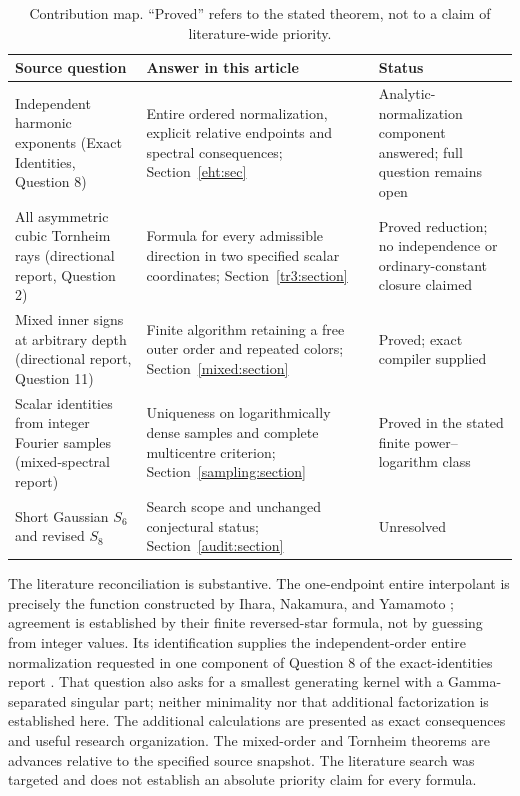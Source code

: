 \begin{table}[htbp]
\centering\small
\begin{tabular}{@{}L{0.28\textwidth}L{0.43\textwidth}L{0.22\textwidth}@{}}
\toprule
Source question & Answer in this article & Status \\
\midrule
Independent harmonic exponents (Exact Identities, Question 8)
& Entire ordered normalization, explicit relative endpoints and
  spectral consequences; Section~\ref{eht:sec}
& Analytic-normalization component answered; full question remains open \\
\addlinespace
All asymmetric cubic Tornheim rays (directional report, Question 2)
& Formula for every admissible direction in two specified scalar
  coordinates; Section~\ref{tr3:section}
& Proved reduction; no independence or ordinary-constant closure claimed \\
\addlinespace
Mixed inner signs at arbitrary depth (directional report, Question 11)
& Finite algorithm retaining a free outer order and repeated colors;
  Section~\ref{mixed:section}
& Proved; exact compiler supplied \\
\addlinespace
Scalar identities from integer Fourier samples (mixed-spectral report)
& Uniqueness on logarithmically dense samples and complete multicentre
  criterion; Section~\ref{sampling:section}
& Proved in the stated finite power--logarithm class \\
\addlinespace
Short Gaussian $S_6$ and revised $S_8$
& Search scope and unchanged conjectural status;
  Section~\ref{audit:section}
& Unresolved \\
\bottomrule
\end{tabular}
\caption{Contribution map. ``Proved'' refers to the stated theorem,
not to a claim of literature-wide priority.}\label{scope:map}
\end{table}

The literature reconciliation is substantive. The one-endpoint
entire interpolant is precisely the function constructed by Ihara,
Nakamura, and Yamamoto \cite{eht:INY}; agreement is established by
their finite reversed-star formula, not by guessing from integer
values. Its identification supplies the independent-order entire
normalization requested in one component of Question 8 of the
exact-identities report \cite{RepoExact}. That question also asks for
a smallest generating kernel with a Gamma-separated singular part;
neither minimality nor that additional factorization is established
here. The additional calculations
are presented as exact consequences and useful research organization.
The mixed-order and Tornheim theorems are advances relative to the
specified source snapshot. The literature search was targeted and
does not establish an absolute priority claim for every formula.

